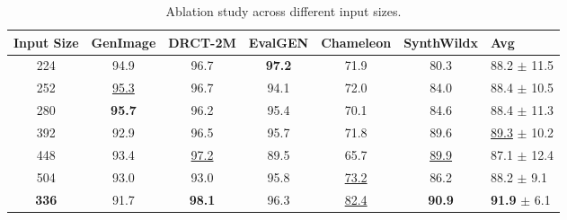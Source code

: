 \documentclass{article}
\begin{document}
\begin{table}[tb!]
\centering
\caption{Ablation study across different input sizes.}
\label{tab:cropsize-comparison}
\begin{adjustbox}{width=1.0\linewidth}
\begin{tabular}{ccccccl}
\toprule
Input Size & GenImage & DRCT-2M & EvalGEN & Chameleon & SynthWildx & Avg \\
\midrule
224 & 94.9 & 96.7 & \textbf{97.2} & 71.9 & 80.3 & 88.2 $\pm$ 11.5 \\
252 & \underline{95.3} & 96.7 & 94.1 & 72.0 & 84.0 & 88.4 $\pm$ 10.5 \\
280 & \textbf{95.7} & 96.2 & 95.4 & 70.1 & 84.6 & 88.4 $\pm$ 11.3 \\
392 & 92.9 & 96.5 & 95.7 & 71.8 & 89.6 & \underline{89.3} $\pm$ 10.2 \\
448 & 93.4 & \underline{97.2} & 89.5 & 65.7 & \underline{89.9} & 87.1 $\pm$ 12.4 \\
504 & 93.0 & 93.0 & 95.8 & \underline{73.2} & 86.2 & 88.2 $\pm$ 9.1 \\
\midrule
\rowcolor{myblue}
\textbf{336} & 91.7 & \textbf{98.1} & 96.3 & \underline{82.4} & \textbf{90.9} & \textbf{91.9} $\pm$ 6.1 \\
\bottomrule
\end{tabular}
\end{adjustbox}
\vspace{0pt}
\end{table}
\end{document}
